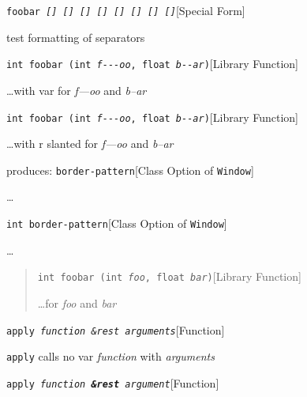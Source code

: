 \documentclass{book}
\begin{document}
%
\noindent\texttt{foobar \EmbracOn{}\textsl{[] \EmbracOff{}\textnormal{[]}\EmbracOn{} \EmbracOff{}\textsl{[]}\EmbracOn{} \EmbracOff{}\texttt{[]}\EmbracOn{} \EmbracOff{}\texttt{[]}\EmbracOn{} \EmbracOff{}\textnormal{\textsl{[]}}\EmbracOn{} \EmbracOff{}\textnormal{\texttt{[]}}\EmbracOn{} \EmbracOff{}\textnormal{\texttt{\textsl{[]}}}\EmbracOn{}}}\hfill[Special Form]



%
test formatting of separators

\noindent\texttt{int foobar (int \textsl{f{-}{-}{-}oo}, float \textsl{b{-}{-}ar})}\hfill[Library Function]



%
\dots{}\@ with var for \textsl{f---oo} and \textsl{b--ar}

\noindent\texttt{int foobar (int \textnormal{\textsl{f{-}{-}{-}oo}}, float \textnormal{\textsl{b{-}{-}ar}})}\hfill[Library Function]



%
\dots{}\@ with r slanted for \textsl{f---oo} and \textsl{b--ar}

\noindent{}produces:
\noindent\texttt{border-pattern}\hfill[Class Option of \texttt{Window}]



%
\dots{}\@

\noindent\texttt{\texttt{int} border-pattern}\hfill[Class Option of \texttt{Window}]



%
\dots{}\@

\begin{quote}
\noindent\texttt{int foobar (int \textsl{foo}, float \textsl{bar})}\hfill[Library Function]



%
\dots{}\@ for \textsl{foo} and \textsl{bar}
\end{quote}

\noindent\texttt{apply \EmbracOn{}\textsl{function \&rest arguments}}\hfill[Function]



%
\texttt{apply} calls no var \textsl{function} with \textsl{arguments}

\noindent\texttt{apply \EmbracOn{}\textsl{function \EmbracOff{}\textnormal{\textbf{\&rest}}\EmbracOn{} argument}}\hfill[Function]
\end{document}
